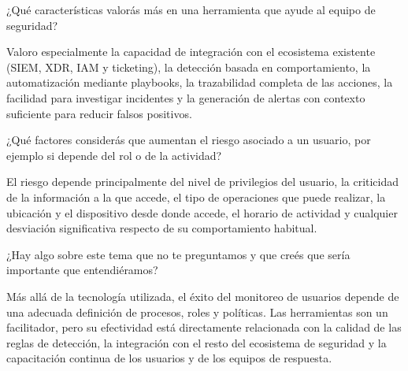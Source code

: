 \begin{description}[leftmargin=0cm, labelsep=0.5cm]
    \item[\textbf{Pregunta 8:}] ¿Qué características valorás más en una herramienta que ayude al equipo de seguridad?

    \item[\textbf{RUIZ MATÍAS GABRIEL:}] Valoro especialmente la capacidad de integración con el ecosistema existente (SIEM, XDR, IAM y ticketing), la detección basada en comportamiento, la automatización mediante playbooks, la trazabilidad completa de las acciones, la facilidad para investigar incidentes y la generación de alertas con contexto suficiente para reducir falsos positivos.

    \item[\textbf{Pregunta 9:}] ¿Qué factores considerás que aumentan el riesgo asociado a un usuario, por ejemplo si depende del rol o de la actividad?

    \item[\textbf{RUIZ MATÍAS GABRIEL:}] El riesgo depende principalmente del nivel de privilegios del usuario, la criticidad de la información a la que accede, el tipo de operaciones que puede realizar, la ubicación y el dispositivo desde donde accede, el horario de actividad y cualquier desviación significativa respecto de su comportamiento habitual.

    \item[\textbf{Pregunta 10:}] ¿Hay algo sobre este tema que no te preguntamos y que creés que sería importante que entendiéramos?

    \item[\textbf{RUIZ MATÍAS GABRIEL:}] Más allá de la tecnología utilizada, el éxito del monitoreo de usuarios depende de una adecuada definición de procesos, roles y políticas. Las herramientas son un facilitador, pero su efectividad está directamente relacionada con la calidad de las reglas de detección, la integración con el resto del ecosistema de seguridad y la capacitación continua de los usuarios y de los equipos de respuesta.
\end{description}
